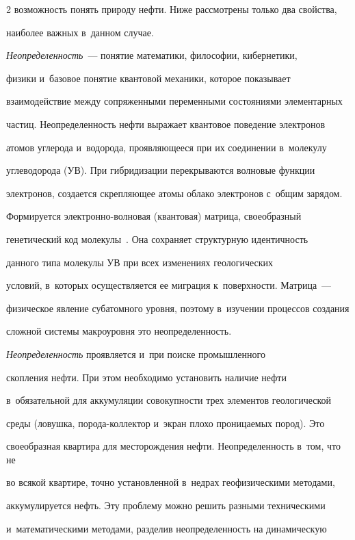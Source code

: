 \begin{multicols}{2}
возможность понять природу нефти. Ниже рассмотрены только два свойства, 

наиболее важных в~данном случае.

    

    \textit{Неопределенность}~--- понятие математики, философии, кибернетики, 

физики и~базовое понятие квантовой механики, которое показывает 

взаимодействие между сопряженными переменными состояниями элементарных 

частиц. Неопределенность нефти выражает квантовое поведение электронов 

атомов углерода и~водорода, проявляющееся при их соединении в~молекулу 

углеводорода (УВ). При гибридизации перекрываются волновые функции 

электронов, создается скрепляющее атомы облако электронов с~общим зарядом. 

Формируется элект\-рон\-но-вол\-но\-вая (квантовая) матрица, своеобразный 

генетический код молекулы~\cite{3-s}. Она сохраняет структурную идентичность 

данного типа молекулы УВ при всех изменениях геологических 

условий, в~которых осуществляется ее миграция к~поверхности. Матрица~--- 

физическое явление субатомного уровня, поэтому в~изучении процессов создания 

сложной системы макроуровня это неопределенность. 

    

    \textit{Неопределенность} проявляется и~при поиске промышленного 

скопления нефти. При этом необходимо установить наличие нефти 

в~обязательной для аккумуляции совокупности трех элементов геологической 

среды (ловушка, по\-ро\-да-кол\-лек\-тор и~экран плохо проницаемых пород). Это 

своеобразная квартира для месторождения нефти. Неопределенность в~том, что не 

во всякой квартире, точно установленной в~недрах геофизическими методами, 

аккумулируется нефть. Эту проблему можно решить разными техническими 

и~математическими методами, разделив неопределенность на динамическую 


\end{multicols}
